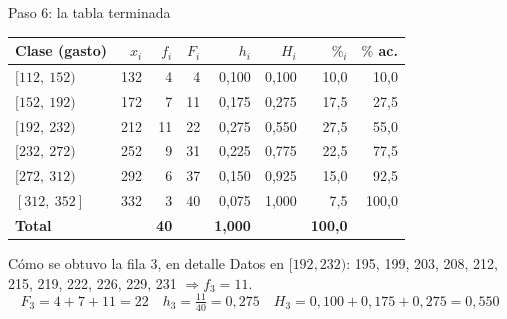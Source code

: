 \documentclass[aspectratio=169,10pt]{beamer}
\begin{document}
\begin{frame}{Paso 6: la tabla terminada}
  \scriptsize
  \begin{center}
  \begin{tabular}{@{}lrrrrrrr@{}}
    \toprule
    \textbf{Clase (gasto)} & \textbf{$x_i$} & \textbf{$f_i$} & \textbf{$F_i$} &
    \textbf{$h_i$} & \textbf{$H_i$} & \textbf{$\%_i$} & \textbf{$\%$ ac.} \\
    \midrule
    $[112,\ 152)$ & 132 &  4 &  4 & 0{,}100 & 0{,}100 & 10{,}0 &  10{,}0 \\
    $[152,\ 192)$ & 172 &  7 & 11 & 0{,}175 & 0{,}275 & 17{,}5 &  27{,}5 \\
    $[192,\ 232)$ & 212 & 11 & 22 & 0{,}275 & 0{,}550 & 27{,}5 &  55{,}0 \\
    $[232,\ 272)$ & 252 &  9 & 31 & 0{,}225 & 0{,}775 & 22{,}5 &  77{,}5 \\
    $[272,\ 312)$ & 292 &  6 & 37 & 0{,}150 & 0{,}925 & 15{,}0 &  92{,}5 \\
    $[312,\ 352]$ & 332 &  3 & 40 & 0{,}075 & 1{,}000 &  7{,}5 & 100{,}0 \\
    \midrule
    \textbf{Total} & & \textbf{40} & & \textbf{1{,}000} & & \textbf{100{,}0} & \\
    \bottomrule
  \end{tabular}
  \end{center}

  \vspace{0.1cm}
  \begin{exampleblock}{Cómo se obtuvo la fila 3, en detalle}
    \scriptsize
    Datos en $[192, 232)$: 195, 199, 203, 208, 212, 215, 219, 222, 226, 229,
    231 $\Rightarrow f_3 = 11$.
    \[ F_3 = 4+7+11 = 22 \quad h_3 = \tfrac{11}{40}=0{,}275 \quad
       H_3 = 0{,}100+0{,}175+0{,}275 = 0{,}550 \]
  \end{exampleblock}
\end{frame}
\end{document}
